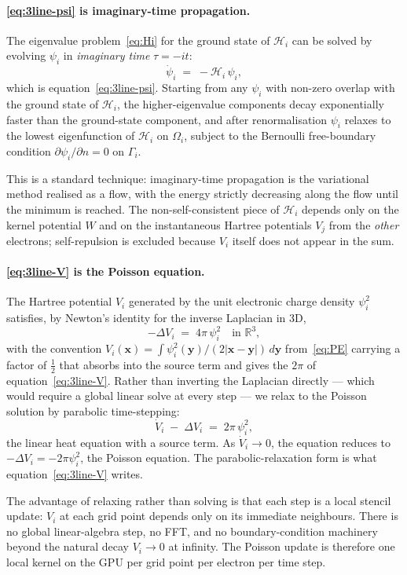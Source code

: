 \paragraph{\eqref{eq:3line-psi} is imaginary-time propagation.} The eigenvalue problem~\eqref{eq:Hi} for the ground state of $\mathcal{H}_i$ can be solved by evolving $\psi_i$ in \emph{imaginary time} $\tau = -i t$:
\[
\dot{\psi}_i \;=\; -\mathcal{H}_i\, \psi_i,
\]
which is equation~\eqref{eq:3line-psi}. Starting from any $\psi_i$ with non-zero overlap with the ground state of $\mathcal{H}_i$, the higher-eigenvalue components decay exponentially faster than the ground-state component, and after renormalisation $\psi_i$ relaxes to the lowest eigenfunction of $\mathcal{H}_i$ on $\Omega_i$, subject to the Bernoulli free-boundary condition $\partial\psi_i / \partial n = 0$ on $\Gamma_i$.

This is a standard technique: imaginary-time propagation is the variational method realised as a flow, with the energy strictly decreasing along the flow until the minimum is reached. The non-self-consistent piece of $\mathcal{H}_i$ depends only on the kernel potential $W$ and on the instantaneous Hartree potentials $V_j$ from the \emph{other} electrons; self-repulsion is excluded because $V_i$ itself does not appear in the sum.

\paragraph{\eqref{eq:3line-V} is the Poisson equation.} The Hartree potential $V_i$ generated by the unit electronic charge density $\psi_i^2$ satisfies, by Newton's identity for the inverse Laplacian in 3D,
\[
-\Delta V_i \;=\; 4\pi\, \psi_i^2 \quad\text{in } \mathbb{R}^3,
\]
with the convention $V_i(\mathbf{x}) = \int \psi_i^2(\mathbf{y}) / (2|\mathbf{x}-\mathbf{y}|) \,d\mathbf{y}$ from~\eqref{eq:PE} carrying a factor of $\tfrac{1}{2}$ that absorbs into the source term and gives the $2\pi$ of equation~\eqref{eq:3line-V}. Rather than inverting the Laplacian directly --- which would require a global linear solve at every step --- we relax to the Poisson solution by parabolic time-stepping:
\[
\dot{V}_i \;-\; \Delta V_i \;=\; 2\pi\, \psi_i^2,
\]
the linear heat equation with a source term. As $\dot{V}_i \to 0$, the equation reduces to $-\Delta V_i = -2\pi\psi_i^2$, the Poisson equation. The parabolic-relaxation form is what equation~\eqref{eq:3line-V} writes.

The advantage of relaxing rather than solving is that each step is a local stencil update: $V_i$ at each grid point depends only on its immediate neighbours. There is no global linear-algebra step, no FFT, and no boundary-condition machinery beyond the natural decay $V_i \to 0$ at infinity. The Poisson update is therefore one local kernel on the GPU per grid point per electron per time step.

